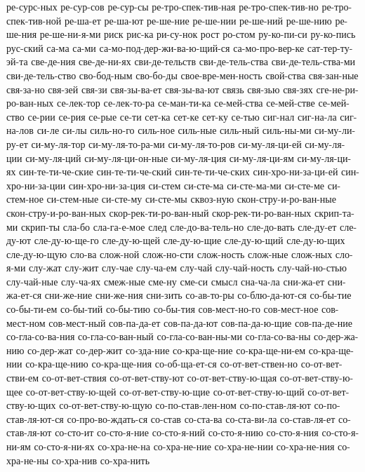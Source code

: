 {ре-сурс-ных
ре-сур-сов
ре-сур-сы
ре-тро-спек-тив-ная
ре-тро-спек-тив-но
ре-тро-спек-тив-ной
ре-ша-ет
ре-ша-ют
ре-ше-ние
ре-ше-нии
ре-ше-ний
ре-ше-нию
ре-ше-ния
ре-ше-ни-я-ми
риск
рис-ка
ри-су-нок
рост
ро-стом
ру-ко-пи-си
ру-ко-пись
рус-ский
са-ма
са-ми
са-мо-под-дер-жи-ва-ю-щий-ся
са-мо-про-вер-ке
сат-тер-ту-эй-та
све-де-ния
све-де-ни-ях
сви-де-тельств
сви-де-тель-ства
сви-де-тель-ства-ми
сви-де-тель-ство
сво-бод-ным
сво-бо-ды
свое-вре-мен-ность
свой-ства
свя-зан-ные
свя-за-но
свя-зей
свя-зи
свя-зы-ва-ет
свя-зы-ва-ют
связь
свя-зью
свя-зях
сге-не-ри-ро-ван-ных
се-лек-тор
се-лек-то-ра
се-ман-ти-ка
се-мей-ства
се-мей-стве
се-мей-ство
се-рии
се-рия
се-рые
се-ти
сет-ка
сет-ке
сет-ку
се-тью
сиг-нал
сиг-на-ла
сиг-на-лов
си-ле
си-лы
силь-но-го
силь-ное
силь-ные
силь-ный
силь-ны-ми
си-му-ли-ру-ет
си-му-ля-тор
си-му-ля-то-ра-ми
си-му-ля-то-ров
си-му-ля-ци-ей
си-му-ля-ции
си-му-ля-ций
си-му-ля-ци-он-ные
си-му-ля-ция
си-му-ля-ци-ям
си-му-ля-ци-ях
син-те-ти-че-ские
син-те-ти-че-ский
син-те-ти-че-ских
син-хро-ни-за-ци-ей
син-хро-ни-за-ции
син-хро-ни-за-ция
си-стем
си-сте-ма
си-сте-ма-ми
си-сте-ме
си-стем-ное
си-стем-ные
си-сте-му
си-сте-мы
сквоз-ную
скон-стру-и-ро-ван-ные
скон-стру-и-ро-ван-ных
скор-рек-ти-ро-ван-ный
скор-рек-ти-ро-ван-ных
скрип-та-ми
скрип-ты
сла-бо
сла-га-е-мое
след
сле-до-ва-тель-но
сле-до-вать
сле-ду-ет
сле-ду-ют
сле-ду-ю-ще-го
сле-ду-ю-щей
сле-ду-ю-щие
сле-ду-ю-щий
сле-ду-ю-щих
сле-ду-ю-щую
сло-ва
слож-ной
слож-но-сти
слож-ность
слож-ные
слож-ных
сло-я-ми
слу-жат
слу-жит
слу-чае
слу-ча-ем
слу-чай
слу-чай-ность
слу-чай-но-стью
слу-чай-ные
слу-ча-ях
смеж-ные
сме-ну
сме-си
смысл
сна-ча-ла
сни-жа-ет
сни-жа-ет-ся
сни-же-ние
сни-же-ния
сни-зить
со-ав-то-ры
со-блю-да-ют-ся
со-бы-тие
со-бы-ти-ем
со-бы-тий
со-бы-тию
со-бы-тия
сов-мест-но-го
сов-мест-ное
сов-мест-ном
сов-мест-ный
сов-па-да-ет
сов-па-да-ют
сов-па-да-ю-щие
сов-па-де-ние
со-гла-со-ва-ния
со-гла-со-ван-ный
со-гла-со-ван-ны-ми
со-гла-со-ва-ны
со-дер-жа-нию
со-дер-жат
со-дер-жит
со-зда-ние
со-кра-ще-ние
со-кра-ще-ни-ем
со-кра-ще-нии
со-кра-ще-нию
со-кра-ще-ния
со-об-ща-ет-ся
со-от-вет-ствен-но
со-от-вет-стви-ем
со-от-вет-ствия
со-от-вет-ству-ют
со-от-вет-ству-ю-щая
со-от-вет-ству-ю-щее
со-от-вет-ству-ю-щей
со-от-вет-ству-ю-щие
со-от-вет-ству-ю-щий
со-от-вет-ству-ю-щих
со-от-вет-ству-ю-щую
со-по-став-лен-ном
со-по-став-ля-ют
со-по-став-ля-ют-ся
со-про-во-ждать-ся
со-став
со-ста-ва
со-ста-ви-ла
со-став-ля-ет
со-став-ля-ют
со-сто-ит
со-сто-я-ние
со-сто-я-ний
со-сто-я-нию
со-сто-я-ния
со-сто-я-ни-ям
со-сто-я-ни-ях
со-хра-не-на
со-хра-не-ние
со-хра-не-нии
со-хра-не-ния
со-хра-не-ны
со-хра-нив
со-хра-нить
}
